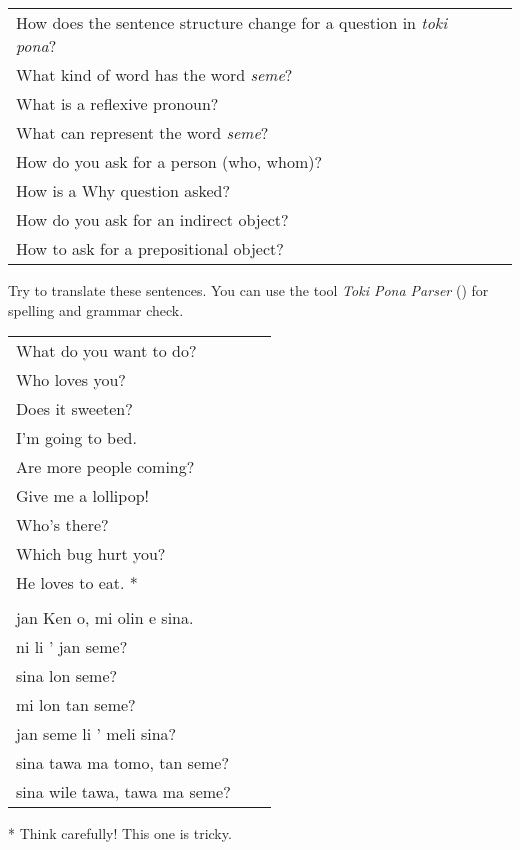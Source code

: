 \begin{supertabular}{p{5,5cm}|ll}
How does the sentence structure change for a question in \textit{toki pona}? &&  \\ %
What kind of word has the word \textit{seme}? &&  \\ %
What is a reflexive pronoun? &&  \\ %
What can represent the word \textit{seme}? &&   \\ %
How do you ask for a person (who, whom)? &&  \\ %
How is a Why question asked? &&  \\ %
How do you ask for an indirect object? &&  \\ %
How to ask for a prepositional object? &&  \\ %
\end{supertabular}

Try to translate these sentences. 
You can use the tool \textit{Toki Pona Parser} (\cite{www:rowa:02}) for spelling and grammar check. 

\begin{supertabular}{p{5,5cm}|ll}
What do you want to do? &&   \\ %
Who loves you? &&   \\ %
Does it sweeten?  &&  \\ %
I'm going to bed. && \\  %
Are more people coming? &&  \\  %
Give me a lollipop! && \\   %
Who's there? &&   \\ %
Which bug hurt you?  &&  \\ %
He loves to eat. * &&  \\ %
 && \\ %
jan Ken o, mi olin e sina.  && \\  %
ni li ' jan seme?  && \\  %
sina lon seme?   && \\  %
mi lon tan seme?  && \\  %
jan seme li ' meli sina?   && \\    %
sina tawa ma tomo, tan seme?    && \\   %
sina wile tawa, tawa  ma seme?      && \\  %
\end{supertabular} 

* Think carefully! This one is tricky. 
